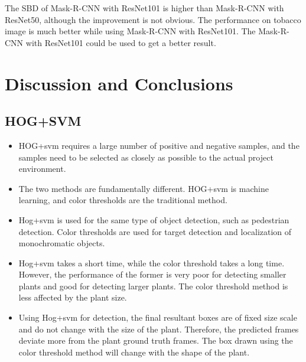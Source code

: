 \documentclass[conference]{IEEEtran}
\begin{document}
The SBD of Mask-R-CNN with ResNet101 is higher than Mask-R-CNN with ResNet50, although the improvement is not obvious. The performance on tobacco image is much better while using Mask-R-CNN with ResNet101. The Mask-R-CNN with ResNet101 could be used to get a better result.

\section{Discussion and Conclusions}
\subsection{HOG+SVM}



\begin{itemize}
\item HOG+svm requires a large number of positive and negative samples, and the samples need to be selected as closely as possible to the actual project environment.
\item The two methods are fundamentally different. HOG+svm is machine learning, and color thresholds are the traditional method.
\item Hog+svm is used for the same type of object detection, such as pedestrian detection. Color thresholds are used for target detection and localization of monochromatic objects.
\item Hog+svm takes a short time, while the color threshold takes a long time. However, the performance of the former is very poor for detecting smaller plants and good for detecting larger plants. The color threshold method is less affected by the plant size.
\item Using Hog+svm for detection, the final resultant boxes are of fixed size scale and do not change with the size of the plant. Therefore, the predicted frames deviate more from the plant ground truth frames. The box drawn using the color threshold method will change with the shape of the plant.
\end{itemize}
\end{document}
